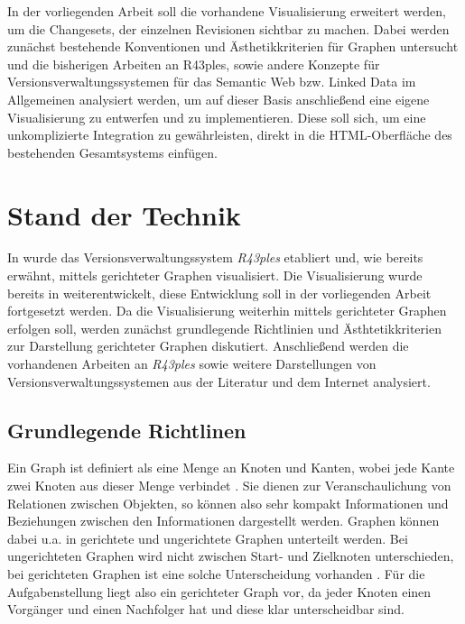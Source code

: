 \documentclass[nocolor]{tudbook}
\begin{document}
In der vorliegenden Arbeit soll die vorhandene Visualisierung erweitert werden, um die Changesets, der einzelnen Revisionen sichtbar zu machen. Dabei werden zunächst bestehende Konventionen und Ästhetikkriterien für Graphen untersucht und die bisherigen Arbeiten an R43ples, sowie andere Konzepte für Versionsverwaltungssystemen für das Semantic Web bzw. Linked Data im Allgemeinen analysiert werden, um auf dieser Basis anschließend eine eigene Visualisierung zu entwerfen und zu implementieren. Diese soll sich, um eine unkomplizierte Integration zu gewährleisten, direkt in die HTML-Oberfläche des bestehenden Gesamtsystems einfügen.

\chapter{Stand der Technik}
In \cite{Graube} wurde das Versionsverwaltungssystem \textit{R43ples} etabliert und, wie bereits erwähnt, mittels gerichteter Graphen visualisiert. Die Visualisierung wurde bereits in \cite{Gruppe2.3,Gruppe2.1} weiterentwickelt, diese Entwicklung soll in der vorliegenden Arbeit fortgesetzt werden. Da die Visualisierung weiterhin mittels gerichteter Graphen erfolgen soll, werden zunächst grundlegende Richtlinien und Ästhtetikkriterien zur Darstellung gerichteter Graphen diskutiert. Anschließend werden die vorhandenen Arbeiten an \textit{R43ples} sowie weitere Darstellungen von Versionsverwaltungssystemen aus der Literatur und dem Internet analysiert.

\section{Grundlegende Richtlinen}
\label{sec:Richtlinien}
Ein Graph ist definiert als eine Menge an Knoten und Kanten, wobei jede Kante zwei Knoten aus dieser Menge verbindet \cite[Seite 2]{Graphenoptimierung}. Sie dienen zur Veranschaulichung von Relationen zwischen Objekten, so können also sehr kompakt Informationen und Beziehungen zwischen den Informationen dargestellt werden. Graphen können dabei u.a. in gerichtete und ungerichtete Graphen unterteilt werden. Bei ungerichteten Graphen wird nicht zwischen Start- und Zielknoten unterschieden, bei gerichteten Graphen ist eine solche Unterscheidung vorhanden \cite{diskreteMathematik}. Für die Aufgabenstellung liegt also ein gerichteter Graph vor, da jeder Knoten einen Vorgänger und einen Nachfolger hat und diese klar unterscheidbar sind.
\end{document}
